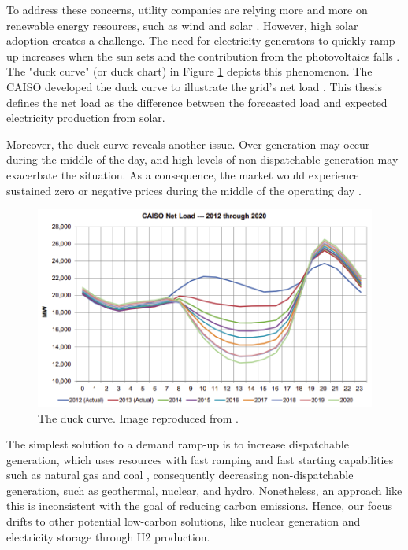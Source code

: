 To address these concerns, utility companies are relying more and more on renewable energy resources, such as wind and solar \cite{ming_resource_2019}.
However, high solar adoption creates a challenge.
The need for electricity generators to quickly ramp up increases when the sun sets and the contribution from the photovoltaics falls \cite{us_department_of_energy_confronting_2017}.
The "duck curve" (or duck chart) in Figure \ref{fig:duck} depicts this phenomenon.
The \gls{CAISO} developed the duck curve to illustrate the grid's net load \cite{bouillon_prepared_2014}.
This thesis defines the net load as the difference between the forecasted load and expected electricity production from solar.

Moreover, the duck curve reveals another issue.
Over-generation may occur during the middle of the day, and high-levels of non-dispatchable generation may exacerbate the situation.
As a consequence, the market would experience sustained zero or negative prices during the middle of the operating day \cite{bouillon_prepared_2014}.

\begin{figure}[htbp!]
	\centering
	\includegraphics[width=0.75\linewidth]{figures-hydro/caiso-duck.png}
	\hfill
	\caption{The duck curve. Image reproduced from \cite{bouillon_prepared_2014}.}
	\label{fig:duck}
\end{figure}

The simplest solution to a demand ramp-up is to increase dispatchable generation, which uses resources with fast ramping and fast starting capabilities such as natural gas and coal \cite{bouillon_prepared_2014}, consequently decreasing non-dispatchable generation, such as geothermal, nuclear, and hydro.
Nonetheless, an approach like this is inconsistent with the goal of reducing carbon emissions.
Hence, our focus drifts to other potential low-carbon solutions, like nuclear generation and electricity storage through \gls{H2} production.

